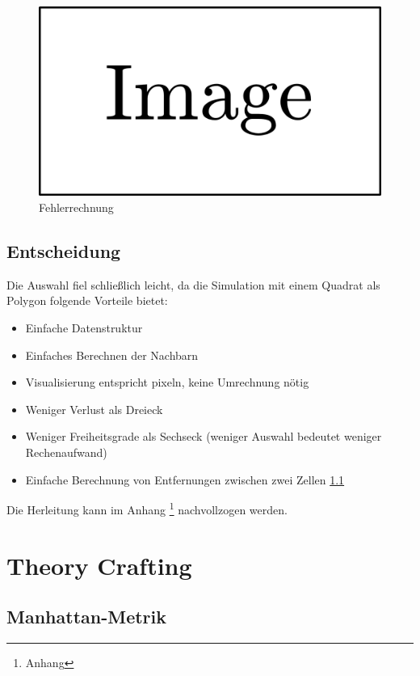 \documentclass{article}
\begin{document}
\begin{figure}
\includegraphics{img/dummy.png}
\caption{Fehlerrechnung}
\label{img:floor_error_circle_polygon}
\end{figure}

\subsection{Entscheidung}

Die Auswahl fiel schließlich leicht, da die Simulation mit einem Quadrat als Polygon
folgende Vorteile bietet:

\begin{itemize}
\item Einfache Datenstruktur
\item Einfaches Berechnen der Nachbarn
\item Visualisierung entspricht pixeln, keine Umrechnung nötig
\item Weniger Verlust als Dreieck
\item Weniger Freiheitsgrade als Sechseck (weniger Auswahl bedeutet weniger Rechenaufwand)
\item Einfache Berechnung von Entfernungen zwischen zwei Zellen \ref{sec:manhattan}
\end{itemize}

Die Herleitung kann im Anhang \footnote{Anhang} nachvollzogen werden.

\clearpage
\section{Theory Crafting}

\subsection{Manhattan-Metrik}
\label{sec:manhattan}
\end{document}

